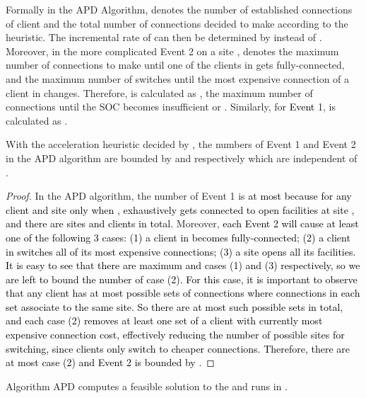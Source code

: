 \documentclass[10pt]{llncs}
\begin{document}
Formally in the APD Algorithm,  denotes the number of established
connections of client  and  the total number of connections
decided to make according to the heuristic. The incremental rate of
\textcolor{black}{}
can then be determined by  instead of . Moreover, in the
more complicated Event 2 on a site ,  denotes the maximum
number of connections to make until one of the clients in 
gets fully-connected, and  the maximum number of switches until
the most expensive connection of a client in 
changes. Therefore,  is calculated as ,
the maximum number of connections until the SOC becomes insufficient
or . Similarly, for \textcolor{black}{Event }1, 
is calculated as .
\begin{lemma}
With the acceleration heuristic decided by \textup{}, the numbers
of Event 1 and Event 2 in the APD algorithm are bounded by \textcolor{black}{}
and \textcolor{black}{} respectively
which are independent of .\label{lem:suh}\end{lemma}
\begin{proof}
In the APD algorithm, the number of Event 1 is \textcolor{black}{at
most  because for any client  and site  only
when ,  exhaustively gets connected to open facilities
at site , and there are  sites and  clients in
total. }Moreover, \textcolor{black}{each Event 2 will cause at least
one of the following 3 cases: (1) a client  in }\textcolor{black}{{}
becomes fully-connected; (2) a client  in }\textcolor{black}{{}
switches all of its most expensive connections; (3) a site opens all
its facilities. It is easy to see that there are maximum 
and  cases (1) and (3) respectively, so we are left to bound
the number of case (2). For this case, it is important to observe
that any client  has at most  possible sets of connections
where connections in each set associate to the same site. So there
are at most  such possible sets in total, and each case
(2) removes at least one set of a client with currently most expensive
connection cost, effectively reducing the number of possible sites
for switching, since clients only switch to cheaper connections. Therefore,
there are at most  case (2) and Event 2 is bounded by
.}\end{proof}
\begin{lemma}
Algorithm APD computes a feasible solution to the  and runs
in .\label{lem:time-SPD}\end{lemma}
\end{document}
